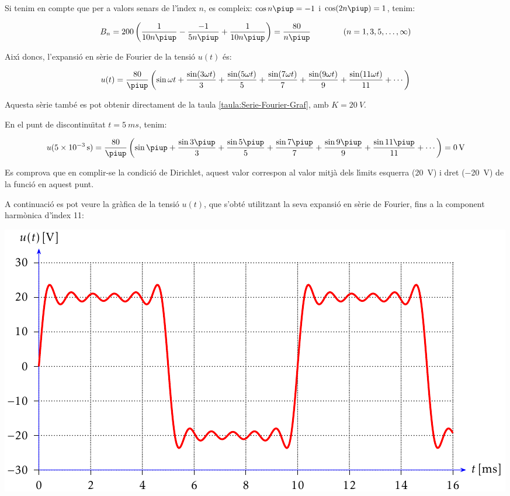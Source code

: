 \begin{exemple}
    Si tenim en compte que per a valors senars de l'\'{\i}ndex $n$, es
    compleix: $\cos n \piup = -1$ i $\cos (2 n \piup) = 1$, tenim:

    \[
        B_n = 200 \left( \frac{1}{10 n \piup} - \frac{-1}{5 n \piup} +
        \frac{1}{10 n \piup} \right) = \frac{80}{n \piup}
        \qquad\qquad(n=1,3,5,\ldots,\infty)
    \]

    Aix\'{\i} doncs, l'expansi\'{o} en s\`{e}rie de Fourier de la tensi\'{o} $u(t)$ \'{e}s:

    \[
        u(t) = \frac{80}{\piup} \left( \sin \omega t + \frac{\sin (3 \omega t)}{3} +
        \frac{\sin (5 \omega t)}{5} + \frac{\sin (7 \omega t)}{7} +
        \frac{\sin (9 \omega t)}{9} + \frac{\sin (11 \omega t)}{11} +\cdots\right)
    \]

    Aquesta s\`{e}rie tamb\'{e} es pot obtenir directament de la taula \vref{taula:Serie-Fourier-Graf}, amb $K=\SI{20}{V}$.

    En el punt de discontinu\"{\i}tat $t=\SI{5}{ms}$, tenim:

    \[
        u(\SI{5e-3}{s}) =\frac{80}{\piup} \left( \sin \piup + \frac{\sin 3 \piup}{3} +
        \frac{\sin 5 \piup}{5} + \frac{\sin 7 \piup}{7} +
        \frac{\sin 9 \piup}{9} +\frac{\sin 11 \piup}{11}+\cdots\right) = \SI{0}{V}
    \]

    Es comprova que en complir-se la condici\'{o} de Dirichlet, aquest valor
    correspon al valor mitj\`{a} dels l\'{\i}mits esquerra (\SI{20}{V}) i dret (\SI{-20}{V})  de
    la funci\'{o} en aquest punt.

    A continuaci\'{o} es pot veure la gr\`{a}fica de la tensi\'{o} $u(t)$, que
    s'obt\'{e} utilitzant la seva expansi\'{o} en s\`{e}rie de Fourier, fins a la
    component harm\`{o}nica d'\'{\i}ndex 11:

    \begin{center}
        \includegraphics{Imatges/Cap-Fourier-Exemple-Tensio.pdf}
    \end{center}


\end{exemple}
